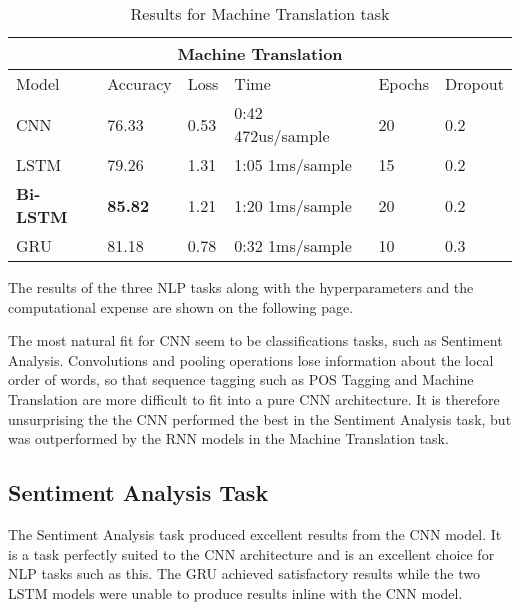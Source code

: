 \documentclass[twocolumn,12pt]{asme2ej}
\begin{document}
\begin{table*}[t]
  \centering
    \begin{tabular}{ |p{2.5cm}||p{1.5cm}|p{1cm}|p{4cm}|p{1.5cm}|p{1.5cm}|  }
     \hline
     \multicolumn{6}{|c|}{Machine Translation} \\
     \hline
     Model & Accuracy & Loss & Time & Epochs & Dropout\\
     \hline
     CNN   & 76.33 & 0.53 & 0:42 472us/sample & 20 & 0.2  \\
     LSTM & 79.26 & 1.31 & 1:05 1ms/sample & 15 & 0.2 \\
     \textbf{Bi-LSTM} & \textbf{85.82} & 1.21 & 1:20 1ms/sample & 20 & 0.2 \\
     GRU   & 81.18 & 0.78 & 0:32 1ms/sample & 10 & 0.3 \\
     \hline
    \end{tabular}
  \caption{Results for Machine Translation task}
  \label{tab:1}
\end{table*}


The results of the three NLP tasks along with the hyperparameters and the computational expense are shown on the following page. 

The most natural fit for CNN seem to be classifications tasks, such as Sentiment Analysis. Convolutions and pooling operations lose information about the local order of words, so that sequence tagging such as POS Tagging and Machine Translation are more difficult to fit into a pure CNN architecture. It is therefore unsurprising the the CNN performed the best in the Sentiment Analysis task, but was outperformed by the RNN models in the Machine Translation task.

\subsection{Sentiment Analysis Task}
The Sentiment Analysis task produced excellent results from the CNN model. It is a task perfectly suited to the CNN architecture and is an excellent choice for NLP tasks such as this. The GRU achieved satisfactory results while the two LSTM models were unable to produce results inline with the CNN model. 
\end{document}
